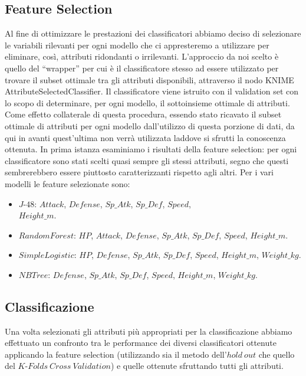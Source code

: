 \documentclass[fleqn,10pt]{SelfArx} %
\begin{document}
\subsection{Feature Selection}
Al fine di ottimizzare le prestazioni dei classificatori abbiamo deciso di selezionare le variabili rilevanti per ogni modello che ci appresteremo a utilizzare per eliminare, così, attributi ridondanti o irrilevanti. L'approccio da noi scelto è quello del “wrapper” per cui è il classificatore stesso ad essere utilizzato per trovare il subset ottimale tra gli attributi disponibili, attraverso il nodo KNIME AttributeSelectedClassifier. %
Il classificatore viene istruito con il validation set con lo scopo di determinare, per ogni modello, il sottoinsieme ottimale di attributi. Come effetto collaterale di questa procedura, essendo stato ricavato il subset ottimale di attributi per ogni modello dall'utilizzo di questa porzione di dati, da qui in avanti quest'ultima non verrà utilizzata laddove si sfrutti la conoscenza ottenuta.
In prima istanza esaminiamo i risultati della feature selection: per ogni classificatore sono stati scelti quasi sempre gli stessi attributi, segno che questi sembrerebbero essere piuttosto caratterizzanti rispetto agli altri. Per i vari modelli le feature selezionate sono:
\begin{itemize}


\item $J$-$48$: $Attack$, $Defense$, $Sp\_Atk$, $Sp\_Def$, $Speed$,
\\ $Height\_m$.
\\
\item $RandomForest$: $HP$, $Attack$, $Defense$, $Sp\_Atk$, $Sp\_Def$, $Speed$, $Height\_m$.

\item $SimpleLogistic$: $HP$, $Defense$, $Sp\_Atk$, $Sp\_Def$, $Speed$, $Height\_m$, $Weight\_kg$.

\item $NBTree$: $Defense$, $Sp\_Atk$, $Sp\_Def$, $Speed$, $Height\_m$, $Weight\_kg$.

\end{itemize}


\subsection{Classificazione}
Una volta selezionati gli attributi più appropriati per la classificazione abbiamo effettuato un confronto tra le performance dei diversi classificatori ottenute applicando la feature selection (utilizzando sia il metodo dell’$hold\ out$ che quello del $K$-$Folds\ Cross\ Validation$) e quelle ottenute sfruttando tutti gli attributi.
\end{document}
